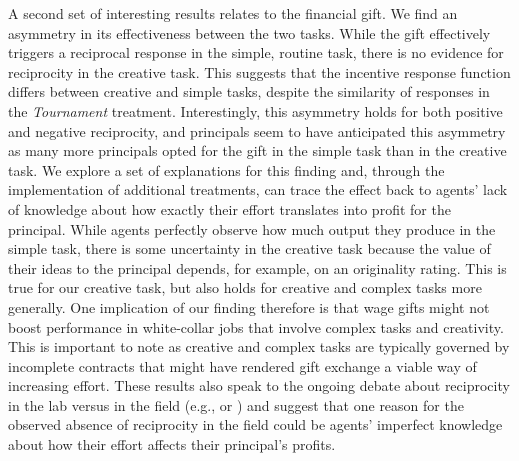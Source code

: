 A second set of interesting results relates to the financial gift. We find an 
asymmetry in  its effectiveness between the two tasks. 
While the gift effectively triggers a reciprocal response in the 
simple, routine task, there is no evidence for reciprocity in the creative task. 
This suggests that the incentive response function differs between creative and simple tasks, 
despite the similarity of responses in the \textit{Tournament} treatment. 
Interestingly, 
this asymmetry holds for both positive and negative reciprocity, and principals 
seem to have anticipated this asymmetry as many more principals opted 
for the gift in the simple task than in the creative task. 
We explore a set of explanations for this finding and, through the implementation of additional treatments, can trace 
the effect back to agents' lack of knowledge about how exactly their effort 
translates into profit for the principal. While agents perfectly observe how much output 
they produce in the simple task, there is some uncertainty in the creative task because the value of their ideas to the principal depends, 
for example, 
on an originality rating. 
This is true for our creative task, but also holds for creative and complex tasks more generally. One implication of our finding therefore is that wage gifts might not boost performance in white-collar jobs that involve complex tasks and creativity. 
This is important to note as creative and complex tasks are typically governed
by incomplete contracts that might have rendered gift exchange a viable way of increasing effort.  
These results also speak to the ongoing debate about reciprocity in the lab versus in the field (e.g., \citealp{Kube2012a} 
or \citealp{Kessler13WP}) and
suggest that one reason for the observed absence of reciprocity in the field could be agents'
imperfect knowledge about how their effort affects their principal's profits. 

